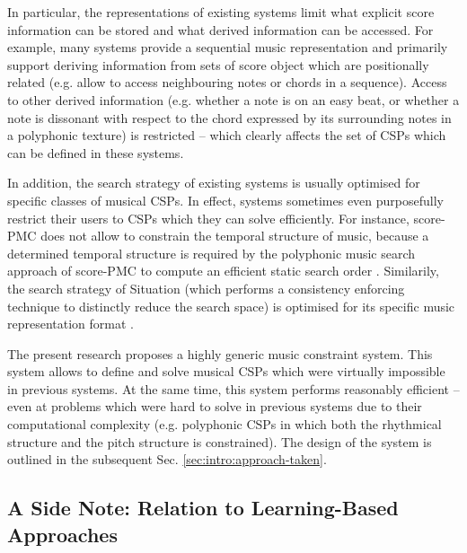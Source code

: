 \documentclass{scrartcl}
\begin{document}
In particular, the representations of existing systems limit what explicit score information can be stored and what derived information can be accessed. For example, many systems provide a sequential music representation and primarily support deriving information from sets of score object which are positionally related (e.g. allow to access neighbouring notes or chords in a sequence). 
Access to other derived information (e.g. whether a note is on an easy beat, or whether a note is dissonant with respect to the chord expressed by its surrounding notes in a polyphonic texture) is restricted -- which clearly affects the set of CSPs which can be defined in these systems.   

In addition, the search strategy of existing systems is usually optimised for specific classes of musical CSPs. In effect, systems sometimes even purposefully restrict their users to CSPs which they can solve efficiently.
For instance, score-PMC does not allow to constrain the temporal structure of music, because a determined temporal structure is required by the polyphonic music search approach of score-PMC to compute an efficient static search order \citep{Laurson:PhD:1996}. Similarily, the search strategy of Situation (which performs a consistency enforcing technique to distinctly reduce the search space) is optimised for its specific music representation format \citep{Rueda:1998}.

The present research proposes a highly generic music constraint system. This system allows to define and solve musical CSPs which were virtually impossible in previous systems. 
At the same time, this system performs reasonably efficient -- even at problems which were hard to solve in previous systems due to their computational complexity (e.g. polyphonic CSPs in which both the rhythmical structure and the pitch structure is constrained).
The design of the system is outlined in the subsequent Sec. \vref{sec:intro:approach-taken}. 


\subsection*{A Side Note: Relation to Learning-Based Approaches}
\end{document}
